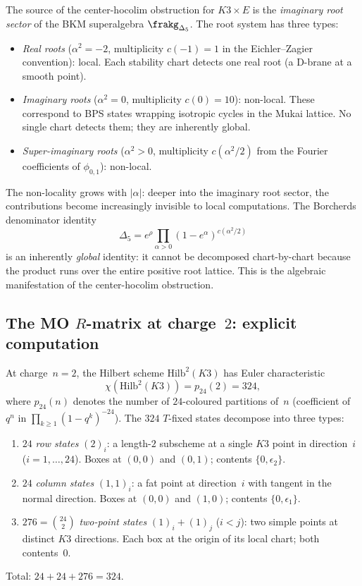 \begin{remark}
\label{rem:imaginary-root-nonlocality}
The source of the center-hocolim obstruction for $K3 \times E$ is
the \emph{imaginary root sector} of the BKM superalgebra
$\frakg_{\Delta_5}$. The root system has three types:
\begin{itemize}
 \item \emph{Real roots} ($\alpha^2 = -2$, multiplicity $c(-1) = 1$
 in the Eichler--Zagier convention): local. Each stability
 chart detects one real root (a D-brane at a smooth point).
 \item \emph{Imaginary roots} ($\alpha^2 = 0$, multiplicity
 $c(0) = 10$): non-local. These correspond to BPS states
 wrapping isotropic cycles in the Mukai lattice. No single
 chart detects them; they are inherently global.
 \item \emph{Super-imaginary roots} ($\alpha^2 > 0$, multiplicity
 $c(\alpha^2/2)$ from the Fourier coefficients of
 $\phi_{0,1}$): non-local.
\end{itemize}
The non-locality grows with $|\alpha|$: deeper into the
imaginary root sector, the contributions become increasingly
invisible to local computations. The Borcherds denominator
identity
\[
 \Delta_5 = e^\rho \prod_{\alpha > 0} (1 - e^\alpha)^{c(\alpha^2/2)}
\]
is an inherently \emph{global} identity: it cannot be
decomposed chart-by-chart because the product runs over the
entire positive root lattice. This is the algebraic manifestation
of the center-hocolim obstruction.
\end{remark}

\subsection{The MO \texorpdfstring{$R$}{R}-matrix at charge~\texorpdfstring{$2$}{2}: explicit computation}
\label{subsec:mo-rmatrix-charge2}

At charge~$n = 2$, the Hilbert scheme $\mathrm{Hilb}^2(K3)$ has
Euler characteristic
\begin{equation}
\label{eq:hilb2-euler}
 \chi(\mathrm{Hilb}^2(K3)) = p_{24}(2) = 324,
\end{equation}
where $p_{24}(n)$ denotes the number of $24$-coloured partitions of~$n$
(coefficient of $q^n$ in $\prod_{k \geq 1} (1 - q^k)^{-24}$).
The $324$ $T$-fixed states decompose into three types:
\begin{enumerate}[label=\textup{(\alph*)}]
 \item $24$ \emph{row states} $(2)_i$: a length-$2$ subscheme at
 a single $K3$ point in direction~$i$ ($i = 1, \ldots, 24$).
 Boxes at $(0,0)$ and $(0,1)$; contents $\{0, \epsilon_2\}$.
 \item $24$ \emph{column states} $(1,1)_i$: a fat point at
 direction~$i$ with tangent in the normal direction.
 Boxes at $(0,0)$ and $(1,0)$; contents $\{0, \epsilon_1\}$.
 \item $276 = \binom{24}{2}$ \emph{two-point states}
 $(1)_i + (1)_j$ ($i < j$): two simple points at distinct $K3$
 directions. Each box at the origin of its local chart; both contents~$0$.
\end{enumerate}
Total: $24 + 24 + 276 = 324$.

